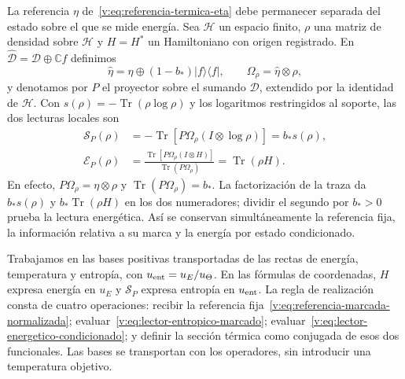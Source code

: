 La referencia $\eta$ de~\eqref{v:eq:referencia-termica-eta} debe permanecer
separada del estado sobre el que se mide energía. Sea $\mathcal H$ un espacio
finito, $\rho$ una matriz de densidad sobre $\mathcal H$ y
$H=H^*$ un Hamiltoniano con origen registrado. En
$\widehat{\mathcal D}=\mathcal D\oplus\mathbb C f$ definimos
\begin{equation}
 \widehat\eta=\eta\oplus(1-b_*)|f\rangle\langle f|,
 \qquad \Omega_\rho=\widehat\eta\otimes\rho,
 \label{v:eq:referencia-marcada-normalizada}
\end{equation}
y denotamos por $P$ el proyector sobre el sumando $\mathcal D$, extendido
por la identidad de $\mathcal H$. Con
$s(\rho)=-\operatorname{Tr}(\rho\log\rho)$ y los logaritmos restringidos
al soporte, las dos lecturas locales son
\begin{align}
 \mathcal S_P(\rho)
 &=-\operatorname{Tr}\!\left[P\Omega_\rho
                 (I\otimes\log\rho)\right]
   =b_*s(\rho),\label{v:eq:lector-entropico-marcado}\\
 \mathcal E_P(\rho)
 &=\frac{\operatorname{Tr}\!\left[P\Omega_\rho(I\otimes H)\right]}
         {\operatorname{Tr}(P\Omega_\rho)}
   =\operatorname{Tr}(\rho H).
 \label{v:eq:lector-energetico-condicionado}
\end{align}
En efecto, $P\Omega_\rho=\eta\otimes\rho$ y
$\operatorname{Tr}(P\Omega_\rho)=b_*$. La factorización de la traza da
$b_*s(\rho)$ y $b_*\operatorname{Tr}(\rho H)$ en los dos numeradores;
dividir el segundo por $b_*>0$ prueba la lectura energética. Así se
conservan simultáneamente la referencia fija, la información relativa a
su marca y la energía por estado condicionado.

Trabajamos en las bases positivas transportadas de las rectas de energía,
temperatura y entropía, con $u_{\rm ent}=u_E/u_\Theta$. En las fórmulas de
coordenadas, $H$ expresa energía en $u_E$ y $\mathcal S_P$ expresa entropía
en $u_{\rm ent}$. La regla de realización consta de cuatro operaciones:
recibir la referencia fija~\eqref{v:eq:referencia-marcada-normalizada};
evaluar~\eqref{v:eq:lector-entropico-marcado};
evaluar~\eqref{v:eq:lector-energetico-condicionado}; y definir la sección
térmica como conjugada de esos dos funcionales. Las bases se transportan con
los operadores, sin introducir una temperatura objetivo.

